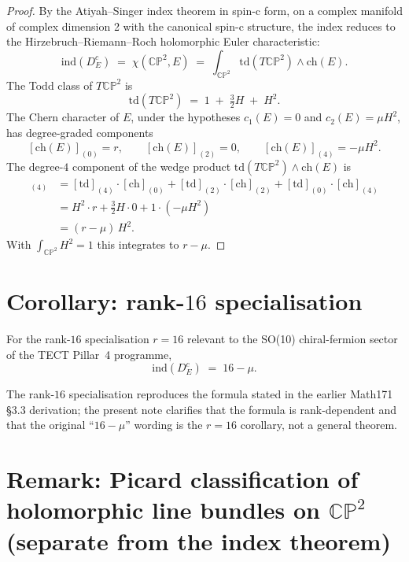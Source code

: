 \begin{proof}[Proof]
By the Atiyah--Singer index theorem in spin-c form, on a complex
manifold of complex dimension 2 with the canonical spin-c structure,
the index reduces to the Hirzebruch--Riemann--Roch holomorphic Euler
characteristic:
\[
\mathrm{ind}(D_E^c) \;=\; \chi(\mathbb{CP}^2, E) \;=\;
\int_{\mathbb{CP}^2} \mathrm{td}(T\mathbb{CP}^2) \wedge \mathrm{ch}(E).
\]
The Todd class of $T\mathbb{CP}^2$ is
\[
\mathrm{td}(T\mathbb{CP}^2) \;=\; 1 \;+\; \tfrac{3}{2} H \;+\; H^2.
\]
The Chern character of $E$, under the hypotheses $c_1(E) = 0$ and
$c_2(E) = \mu H^2$, has degree-graded components
\[
[\mathrm{ch}(E)]_{(0)} = r, \qquad [\mathrm{ch}(E)]_{(2)} = 0, \qquad
[\mathrm{ch}(E)]_{(4)} = - \mu H^2.
\]
The degree-$4$ component of the wedge product
$\mathrm{td}(T\mathbb{CP}^2) \wedge \mathrm{ch}(E)$ is
\begin{align*}
[\mathrm{td} \wedge \mathrm{ch}]_{(4)} &=
[\mathrm{td}]_{(4)} \cdot [\mathrm{ch}]_{(0)} +
[\mathrm{td}]_{(2)} \cdot [\mathrm{ch}]_{(2)} +
[\mathrm{td}]_{(0)} \cdot [\mathrm{ch}]_{(4)} \\
&= H^2 \cdot r + \tfrac{3}{2} H \cdot 0 + 1 \cdot (-\mu H^2) \\
&= (r - \mu)\, H^2.
\end{align*}
With $\int_{\mathbb{CP}^2} H^2 = 1$ this integrates to $r - \mu$.
\end{proof}

\section{Corollary: rank-$16$ specialisation}

\begin{corollary}
\label{cor:rank16}
For the rank-$16$ specialisation $r = 16$ relevant to the SO(10)
chiral-fermion sector of the TECT Pillar~4 programme,
\[
\mathrm{ind}(D_E^c) \;=\; 16 - \mu.
\]
\end{corollary}

The rank-$16$ specialisation reproduces the formula stated in the
earlier Math171 \S3.3 derivation; the present note clarifies that the
formula is rank-dependent and that the original ``$16 - \mu$'' wording
is the $r=16$ corollary, not a general theorem.

\section{Remark: Picard classification of holomorphic line bundles
on $\mathbb{CP}^2$ (separate from the index theorem)}

